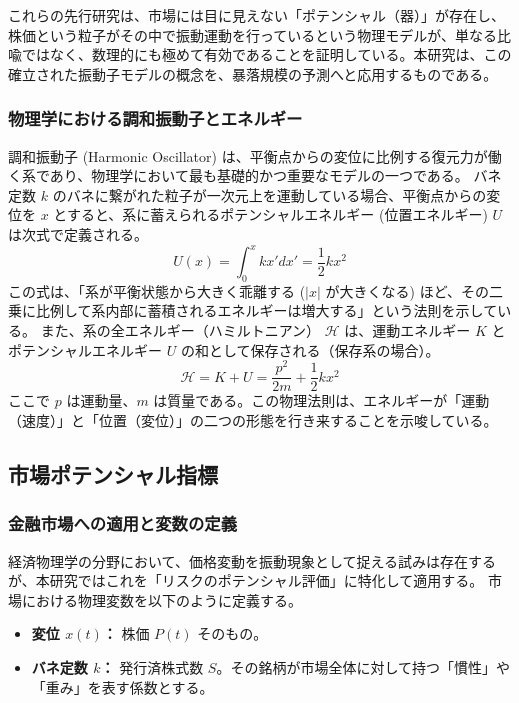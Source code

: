 \documentclass[11pt,a4paper,oneside]{ltjsarticle}
\begin{document}
これらの先行研究は、市場には目に見えない「ポテンシャル（器）」が存在し、株価という粒子がその中で振動運動を行っているという物理モデルが、単なる比喩ではなく、数理的にも極めて有効であることを証明している。本研究は、この確立された振動子モデルの概念を、暴落規模の予測へと応用するものである。

\subsubsection{物理学における調和振動子とエネルギー}
調和振動子 (Harmonic Oscillator) は、平衡点からの変位に比例する復元力が働く系であり、物理学において最も基礎的かつ重要なモデルの一つである。
バネ定数 $k$ のバネに繋がれた粒子が一次元上を運動している場合、平衡点からの変位を $x$ とすると、系に蓄えられるポテンシャルエネルギー (位置エネルギー) $U$ は次式で定義される。
\begin{equation}
U(x) = \int_{0}^{x} kx' dx' = \frac{1}{2}kx^{2}
\end{equation}
この式は、「系が平衡状態から大きく乖離する ($|x|$ が大きくなる) ほど、その二乗に比例して系内部に蓄積されるエネルギーは増大する」という法則を示している。
また、系の全エネルギー（ハミルトニアン） $\mathcal{H}$ は、運動エネルギー $K$ とポテンシャルエネルギー $U$ の和として保存される（保存系の場合）。
\begin{equation}
\mathcal{H} = K + U = \frac{p^{2}}{2m} + \frac{1}{2}kx^{2}
\end{equation}
ここで $p$ は運動量、$m$ は質量である。この物理法則は、エネルギーが「運動（速度）」と「位置（変位）」の二つの形態を行き来することを示唆している。




\subsection{市場ポテンシャル指標}
\subsubsection{金融市場への適用と変数の定義}
経済物理学の分野において、価格変動を振動現象として捉える試みは存在するが、本研究ではこれを「リスクのポテンシャル評価」に特化して適用する。
市場における物理変数を以下のように定義する。

\begin{itemize}
    \item \textbf{変位 $x(t)$：} 株価 $P(t)$ そのもの。
    \item \textbf{バネ定数 $k$：} 発行済株式数 $S$。その銘柄が市場全体に対して持つ「慣性」や「重み」を表す係数とする。
\end{itemize}
\end{document}
